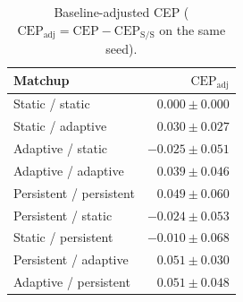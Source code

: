 \begin{table}[!t]
\caption{Baseline-adjusted CEP ($\mathrm{CEP}_{\mathrm{adj}}=\mathrm{CEP}-\mathrm{CEP}_{\mathrm{S/S}}$ on the same seed).}
\label{tab:cep-adj}
\centering
\begin{tabular}{@{}lr@{}}
\toprule
\textbf{Matchup} & $\mathrm{CEP}_{\mathrm{adj}}$ \\
\midrule
Static / static          & $0.000{\pm}0.000$ \\
Static / adaptive        & $0.030{\pm}0.027$ \\
Adaptive / static        & $-0.025{\pm}0.051$ \\
Adaptive / adaptive      & $0.039{\pm}0.046$ \\
Persistent / persistent  & $0.049{\pm}0.060$ \\
Persistent / static      & $-0.024{\pm}0.053$ \\
Static / persistent      & $-0.010{\pm}0.068$ \\
Persistent / adaptive    & $0.051{\pm}0.030$ \\
Adaptive / persistent    & $0.051{\pm}0.048$ \\
\bottomrule
\end{tabular}
\end{table}
